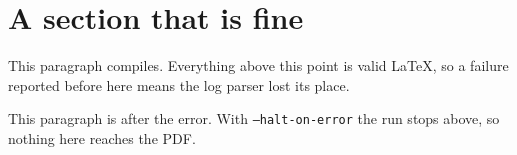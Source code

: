 \documentclass[11pt]{article}
\begin{document}
\section{A section that is fine}

This paragraph compiles. Everything above this point is valid LaTeX, so a
failure reported before here means the log parser lost its place.

\thiscontrolsequencedoesnotexist

This paragraph is after the error. With \texttt{--halt-on-error} the run stops
above, so nothing here reaches the PDF.
\end{document}
